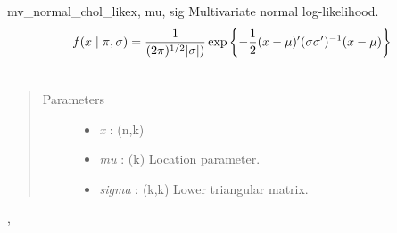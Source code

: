 \hypertarget{pymc.distributions.mv_normal_chol_like}{}\begin{funcdesc}{mv\_normal\_chol\_like}{x, mu, sig}
Multivariate normal log-likelihood.
\begin{gather}
\begin{split}f(x \mid \pi, \sigma) = \frac{1}{(2\pi)^{1/2}|\sigma|)} \exp\left\{ -\frac{1}{2} (x-\mu)^{\prime}(\sigma \sigma^{\prime})^{-1}(x-\mu) \right\}\end{split}\notag\\\begin{split}\end{split}\notag
\end{gather}\begin{quote}\begin{description}
\item[Parameters] \leavevmode\begin{itemize}
\item {} 
\emph{x} : (n,k)

\item {} 
\emph{mu} : (k) Location parameter.

\item {} 
\emph{sigma} : (k,k) Lower triangular matrix.

\end{itemize}

\end{description}\end{quote}




\hyperlink{pymc.distributions.mv_normal_like}{}, \hyperlink{pymc.distributions.mv_normal_cov_like}{}


\end{funcdesc}

